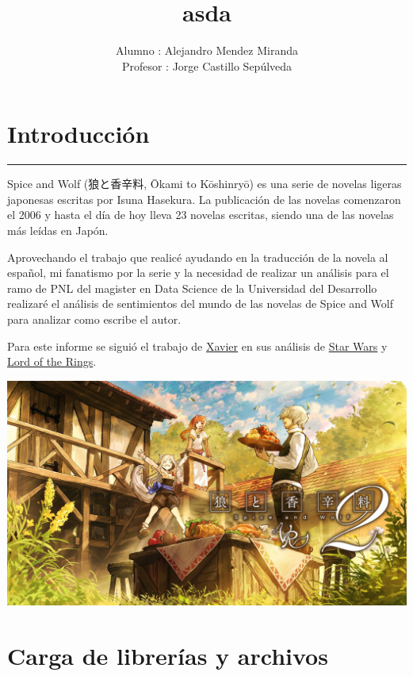 \documentclass[
]{article}
\title{asda}
\author{Alumno : Alejandro Mendez Miranda\\
Profesor : Jorge Castillo Sepúlveda}
\date{}
\begin{document}
\maketitle

\hypertarget{introducciuxf3n}{%
\section{\texorpdfstring{\textbf{Introducción}}{Introducción}}\label{introducciuxf3n}}

\begin{center}\rule{0.5\linewidth}{0.5pt}\end{center}

Spice and Wolf (狼と香辛料, Ōkami to Kōshinryō) es una serie de novelas
ligeras japonesas escritas por Isuna Hasekura. La publicación de las
novelas comenzaron el 2006 y hasta el día de hoy lleva 23 novelas
escritas, siendo una de las novelas más leídas en Japón.

Aprovechando el trabajo que realicé ayudando en la traducción de la
novela al español, mi fanatismo por la serie y la necesidad de realizar
un análisis para el ramo de PNL del magister en Data Science de la
Universidad del Desarrollo realizaré el análisis de sentimientos del
mundo de las novelas de Spice and Wolf para analizar como escribe el
autor.

Para este informe se siguió el trabajo de
\href{https://www.kaggle.com/xvivancos}{Xavier} en sus análisis de
\href{https://www.kaggle.com/xvivancos/analyzing-star-wars-movie-scripts}{Star
Wars} y
\href{https://www.kaggle.com/xvivancos/analyzing-the-lord-of-the-rings-data}{Lord
of the Rings}.

\includegraphics{EisJLXFVkAAZN1c.jpg}

\hypertarget{carga-de-libreruxedas-y-archivos}{%
\section{\texorpdfstring{\textbf{Carga de librerías y
archivos}}{Carga de librerías y archivos}}\label{carga-de-libreruxedas-y-archivos}}
\end{document}
